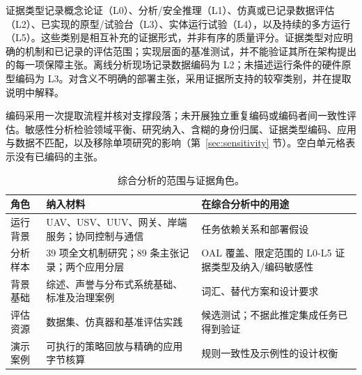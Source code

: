 证据类型记录概念论证（L0）、分析/安全推理（L1）、仿真或已记录数据评估（L2）、已实现的原型/试验台（L3）、实体运行试验（L4），以及持续的多方运行（L5）。这些类别是相互补充的证据形式，并非有序的质量评分。证据类型对应明确的机制和已记录的评估范围；实现层面的基准测试，并不能验证其所在架构提出的每一项保障主张。离线分析现场记录数据编码为 L2；未描述运行条件的硬件原型编码为 L3。对含义不明确的部署主张，采用证据所支持的较窄类别，并在提取说明中解释。

编码采用一次提取流程并核对支撑段落；未开展独立重复编码或编码者间一致性评估。敏感性分析检验领域平衡、研究纳入、含糊的身份归属、证据类型编码、应用与数据不匹配，以及移除单项研究的影响（第~\ref{sec:sensitivity} 节）。空白单元格表示没有已编码的主张。

\begin{table}[H]\small
\caption{综合分析的范围与证据角色。}\label{tab:scope}
\begin{tabularx}{\textwidth}{LLL}\toprule
\textbf{角色} & \textbf{纳入材料} & \textbf{在综合分析中的用途}\\\midrule
运行背景 & UAV、USV、UUV、网关、岸端服务；协同控制与通信 & 任务依赖关系和部署假设\\
分析样本 & 39 项全文机制研究；89 条主张记录；两个应用分层 & OAL 覆盖、限定范围的 L0-L5 证据类型及纳入/编码敏感性\\
背景基础 & 综述、声誉与分布式系统基础、标准及治理案例 & 词汇、替代方案和设计要求\\
评估资源 & 数据集、仿真器和基准评估实践 & 候选测试；不据此推定集成任务已得到验证\\
演示案例 & 可执行的策略回放与精确的应用字节核算 & 规则一致性及示例性的设计权衡\\\bottomrule
\end{tabularx}\end{table}

